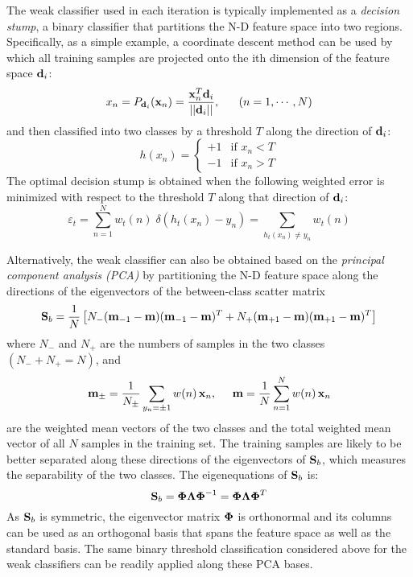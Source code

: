 \documentclass{article}
\begin{document}
The weak classifier used in each iteration is typically implemented
as a {\em decision stump}, a binary classifier that partitions the 
N-D feature space into two regions. Specifically, as a simple example, 
a coordinate descent method can be used by which all training samples 
are projected onto the ith dimension of the feature space ${\bf d}_i$:
\begin{equation}
  x_n=P_{{\bf d}_i}({\bf x}_n)=\frac{{\bf x}_n^T{\bf d}_i}{||{\bf d}_i||},
\;\;\;\;\;\;(n=1,\cdots,N)
\end{equation}
and then classified into two classes by a threshold $T$ along the 
direction of ${\bf d}_i$:
\begin{equation}
  h(x_n)=\left\{\begin{array}{ll}+1& \mbox{if }x_n<T\\-1 & \mbox{if }x_n>T
  \end{array}\right.
\end{equation}
The optimal decision stump is obtained when the following weighted error 
is minimized with respect to the threshold $T$ along that direction of 
${\bf d}_i$:
\begin{equation}
  \varepsilon_t=\sum_{n=1}^N w_t(n)\; \delta(h_t(x_n)-y_n)
  =\sum_{h_t(x_n)\ne y_n} w_t(n)
\end{equation}

Alternatively, the weak classifier can also be obtained based on the
{\em principal component analysis (PCA)} by partitioning the N-D feature
space along the directions of the eigenvectors of the between-class 
scatter matrix
\begin{equation}
  {\bf S}_b=\frac{1}{N}\left[N_-({\bf m}_{-1}-{\bf m})({\bf m}_{-1}-{\bf m})^T
    +N_+({\bf m}_{+1}-{\bf m})({\bf m}_{+1}-{\bf m})^T\right]
\end{equation}
where $N_-$ and $N_+$ are the numbers of samples in the two classes
$(N_-+N_+=N)$, and 
\begin{equation}
  {\bf m}_{\pm}=\frac{1}{N_{\pm}}\sum_{y_n=\pm 1} w(n)\,{\bf x}_n,
  \;\;\;\;\; {\bf m}=\frac{1}{N}\sum_{n=1}^N w(n)\,{\bf x}_n
\end{equation}
are the weighted mean vectors of the two classes and the total 
weighted mean vector of all $N$ samples in the training set. 
The training samples are likely to be better separated along these 
directions of the eigenvectors of ${\bf S}_b$, which measures the 
separability of the two classes. The eigenequations of ${\bf S}_b$
is:
\begin{equation}
  {\bf S}_b={\bf\Phi\Lambda\Phi}^{-1}={\bf\Phi\Lambda\Phi}^T
\end{equation}
As ${\bf S}_b$ is symmetric, the eigenvector matrix ${\bf\Phi}$
is orthonormal and its columns can be used as an orthogonal basis
that spans the feature space as well as the standard basis. The 
same binary threshold classification considered above for the weak
classifiers can be readily applied along these PCA bases.
\end{document}
